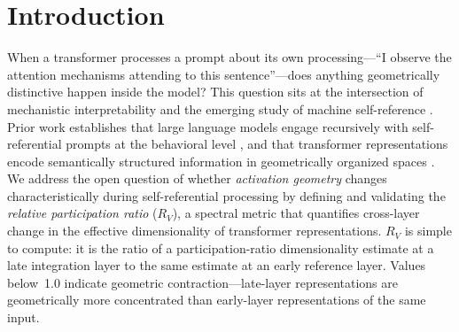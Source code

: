 \documentclass{article}
\newcommand{\RV}{R_V}
\newcommand{\dcohen}{d}
\begin{document}
\begin{abstract}
generation (quality $\rho = -0.415$ to $-0.546$; BT+ART $r = -0.684$ to $-0.729$), replacing an
earlier failed word-count bridge.
Targeted SVD decomposition preserves an expand-then-contract motif
(L5H29: $\dcohen_{\mathrm{rank}} = +0.94$; L27H10: $\dcohen_{\mathrm{rank}} = -1.32$), and
PCA-derived steering outperforms the old mean-difference vector, suggesting a small structured
control subspace rather than a single late axis.
Cross-architecture evidence is mixed rather than universal: locked rows support contraction in
Mistral-7B and Qwen2.5-7B, sign reversal across pipelines in OPT-6.7B and GPT-2~XL, and a null
power-up result in Pythia-1.4B.
Additional base canonical runs are still required before stronger universality claims.
For AI safety, $\RV < 0.737$ detects self-referential content with AUROC~$= 0.909$,
tracking semantic content rather than intent.
\end{abstract}


\section{Introduction}
\label{sec:intro}

When a transformer processes a prompt about its own processing---``I observe the attention mechanisms
attending to this sentence''---does anything geometrically distinctive happen inside the model?
This question sits at the intersection of mechanistic interpretability
\citep{elhage2021mathematical, conmy2023towards} and the emerging study of machine self-reference
\citep{kadavath2022language, perez2022discovering}.
Prior work establishes that large language models engage recursively with self-referential prompts
at the behavioral level \citep{chen2024self}, and that transformer representations encode
semantically structured information in geometrically organized spaces \citep{park2024geometry,
marks2024geometry}.
We address the open question of whether \emph{activation geometry} changes characteristically
during self-referential processing by defining and validating the \emph{relative participation
ratio} ($\RV$), a spectral metric that quantifies cross-layer change in the effective
dimensionality of transformer representations.
$\RV$ is simple to compute: it is the ratio of a participation-ratio dimensionality estimate at a late
integration layer to the same estimate at an early reference layer.
Values below~1.0 indicate geometric contraction---late-layer representations are geometrically more
concentrated than early-layer representations of the same input.
\end{document}
